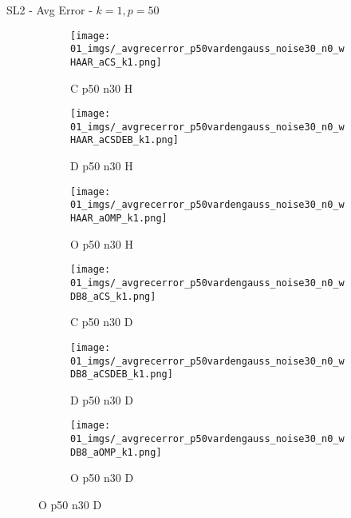 \begin{frame}{SL2 - Avg Error - $k=1,p=50$}{}
\begin{figure}
\vspace{5pt}

\begin{subfigure}{0.13\textwidth}
\texttt{[image: 01\_imgs/\_avgrecerror\_p50vardengauss\_noise30\_n0\_wHAAR\_aCS\_k1.png]}
\caption*{\tiny C p50 n30 H}
\end{subfigure}
\begin{subfigure}{0.13\textwidth}
\texttt{[image: 01\_imgs/\_avgrecerror\_p50vardengauss\_noise30\_n0\_wHAAR\_aCSDEB\_k1.png]}
\caption*{\tiny D p50 n30 H}
\end{subfigure}
\begin{subfigure}{0.13\textwidth}
\texttt{[image: 01\_imgs/\_avgrecerror\_p50vardengauss\_noise30\_n0\_wHAAR\_aOMP\_k1.png]}
\caption*{\tiny O p50 n30 H}
\end{subfigure}
\begin{subfigure}{0.13\textwidth}
\texttt{[image: 01\_imgs/\_avgrecerror\_p50vardengauss\_noise30\_n0\_wDB8\_aCS\_k1.png]}
\caption*{\tiny C p50 n30 D}
\end{subfigure}
\begin{subfigure}{0.13\textwidth}
\texttt{[image: 01\_imgs/\_avgrecerror\_p50vardengauss\_noise30\_n0\_wDB8\_aCSDEB\_k1.png]}
\caption*{\tiny D p50 n30 D}
\end{subfigure}
\begin{subfigure}{0.13\textwidth}
\texttt{[image: 01\_imgs/\_avgrecerror\_p50vardengauss\_noise30\_n0\_wDB8\_aOMP\_k1.png]}
\caption*{\tiny O p50 n30 D}
\end{subfigure}
\end{figure}
\end{frame}



